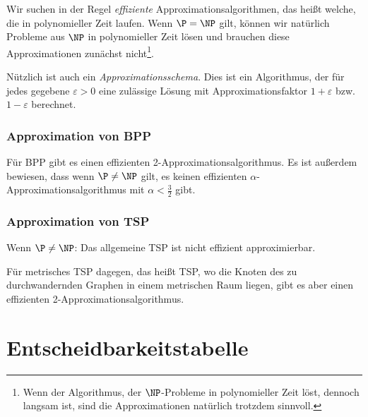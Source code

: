 \documentclass[a4paper,parskip=half*,DIV=7,fontsize=11pt]{scrartcl}
\begin{document}
Wir suchen in der Regel \emph{effiziente} Approximationsalgorithmen, das heißt welche, die in polynomieller Zeit laufen. Wenn $\P = \NP$ gilt, können wir natürlich Probleme aus $\NP$ in polynomieller Zeit lösen und brauchen diese Approximationen zunächst nicht\footnote{Wenn der Algorithmus, der $\NP$-Probleme in polynomieller Zeit löst, dennoch langsam ist, sind die Approximationen natürlich trotzdem sinnvoll.}.

Nützlich ist auch ein \emph{Approximationsschema}. Dies ist ein Algorithmus, der für jedes gegebene $\varepsilon > 0$ eine zulässige Lösung mit Approximationsfaktor $1 + \varepsilon$ bzw. $1 - \varepsilon$ berechnet.

\subsubsection{Approximation von BPP}

Für BPP gibt es einen effizienten 2-Approximationsalgorithmus. Es ist außerdem bewiesen, dass wenn $\P \neq \NP$ gilt, es keinen effizienten $\alpha$-Approximationsalgorithmus mit $\alpha < \frac{3}{2}$ gibt.

\subsubsection{Approximation von TSP}

Wenn $\P \neq \NP$: Das allgemeine TSP ist nicht effizient approximierbar.

Für metrisches TSP dagegen, das heißt TSP, wo die Knoten des zu durchwandernden Graphen in einem metrischen Raum liegen, gibt es aber einen effizienten 2-Approximationsalgorithmus.

\appendix

\section{Entscheidbarkeitstabelle}
\label{sec:entscheidbarkeitstabelle}
\end{document}
